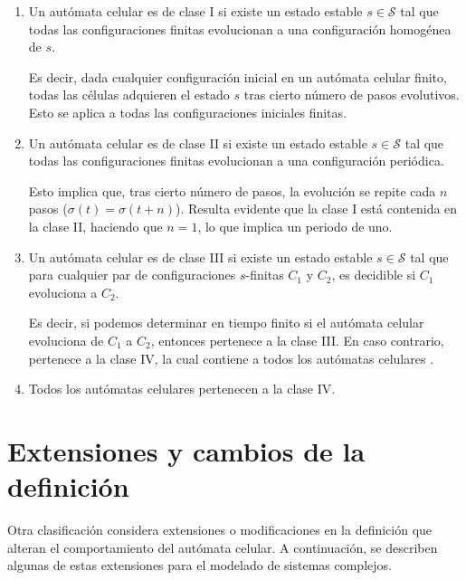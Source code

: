 \begin{enumerate}[label*=CY \Roman*, leftmargin=*]
	\item Un autómata celular es de clase I si existe un estado estable $s \in \mathcal{S}$ tal que todas las configuraciones finitas evolucionan a una configuración homogénea de $s$.
	
	Es decir, dada cualquier configuración inicial en un autómata celular finito, todas las células adquieren el estado $s$ tras cierto número de pasos evolutivos. Esto se aplica a todas las configuraciones iniciales finitas.
	
	\item Un autómata celular es de clase II si existe un estado estable $s \in \mathcal{S}$ tal que todas las configuraciones finitas evolucionan a una configuración periódica.
	
	Esto implica que, tras cierto número de pasos, la evolución se repite cada $n$ pasos ($\sigma(t) = \sigma(t + n)$). Resulta evidente que la clase I está contenida en la clase II, haciendo que $n = 1$, lo que implica un periodo de uno.
	
	\item Un autómata celular es de clase III si existe un estado estable $s \in \mathcal{S}$ tal que para cualquier par de configuraciones $s$-finitas $C_1$ y $C_2$, es decidible si $C_1$ evoluciona a $C_2$.
	
	Es decir, si podemos determinar en tiempo finito si el autómata celular evoluciona de $C_1$ a $C_2$, entonces pertenece a la clase III. En caso contrario, pertenece a la clase IV, la cual contiene a todos los autómatas celulares \cite{culik1988_class}.
	
	\item Todos los autómatas celulares pertenecen a la clase IV.	
\end{enumerate}


\section{Extensiones y cambios de la definición}

Otra clasificación considera extensiones o modificaciones en la definición que alteran el comportamiento del autómata celular. A continuación, se describen algunas de estas extensiones para el modelado de sistemas complejos. 

